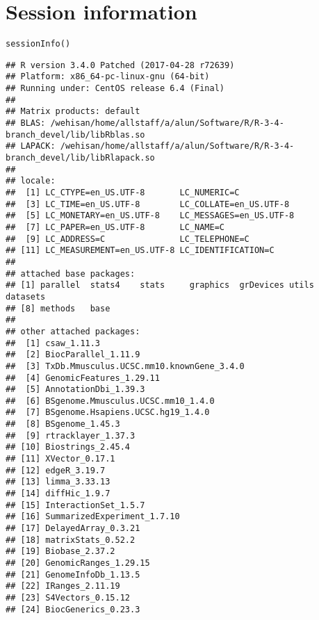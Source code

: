 \documentclass{report}\usepackage[]{graphicx}\usepackage[usenames,dvipsnames]{color}
\newcommand{\hlstd}[1]{\textcolor[rgb]{0.251,0.251,0.251}{#1}}%
\newcommand{\hlkwd}[1]{\textcolor[rgb]{0.878,0.439,0.125}{#1}}%
\newenvironment{knitrout}{}{} %
\begin{document}
\section{Session information}
\begin{knitrout}
\color{fgcolor}\begin{kframe}
\begin{alltt}
\hlkwd{sessionInfo}\hlstd{()}
\end{alltt}
\begin{verbatim}
## R version 3.4.0 Patched (2017-04-28 r72639)
## Platform: x86_64-pc-linux-gnu (64-bit)
## Running under: CentOS release 6.4 (Final)
## 
## Matrix products: default
## BLAS: /wehisan/home/allstaff/a/alun/Software/R/R-3-4-branch_devel/lib/libRblas.so
## LAPACK: /wehisan/home/allstaff/a/alun/Software/R/R-3-4-branch_devel/lib/libRlapack.so
## 
## locale:
##  [1] LC_CTYPE=en_US.UTF-8       LC_NUMERIC=C              
##  [3] LC_TIME=en_US.UTF-8        LC_COLLATE=en_US.UTF-8    
##  [5] LC_MONETARY=en_US.UTF-8    LC_MESSAGES=en_US.UTF-8   
##  [7] LC_PAPER=en_US.UTF-8       LC_NAME=C                 
##  [9] LC_ADDRESS=C               LC_TELEPHONE=C            
## [11] LC_MEASUREMENT=en_US.UTF-8 LC_IDENTIFICATION=C       
## 
## attached base packages:
## [1] parallel  stats4    stats     graphics  grDevices utils     datasets 
## [8] methods   base     
## 
## other attached packages:
##  [1] csaw_1.11.3                             
##  [2] BiocParallel_1.11.9                     
##  [3] TxDb.Mmusculus.UCSC.mm10.knownGene_3.4.0
##  [4] GenomicFeatures_1.29.11                 
##  [5] AnnotationDbi_1.39.3                    
##  [6] BSgenome.Mmusculus.UCSC.mm10_1.4.0      
##  [7] BSgenome.Hsapiens.UCSC.hg19_1.4.0       
##  [8] BSgenome_1.45.3                         
##  [9] rtracklayer_1.37.3                      
## [10] Biostrings_2.45.4                       
## [11] XVector_0.17.1                          
## [12] edgeR_3.19.7                            
## [13] limma_3.33.13                           
## [14] diffHic_1.9.7                           
## [15] InteractionSet_1.5.7                    
## [16] SummarizedExperiment_1.7.10             
## [17] DelayedArray_0.3.21                     
## [18] matrixStats_0.52.2                      
## [19] Biobase_2.37.2                          
## [20] GenomicRanges_1.29.15                   
## [21] GenomeInfoDb_1.13.5                     
## [22] IRanges_2.11.19                         
## [23] S4Vectors_0.15.12                       
## [24] BiocGenerics_0.23.3                     

\end{verbatim}
\end{kframe}
\end{knitrout}
\end{document}
